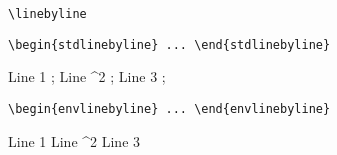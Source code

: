\documentclass{article}
\begin{document}
\verb#\linebyline#

\medskip



\bigskip


\verb#\begin{stdlinebyline} ... \end{stdlinebyline}#

\medskip

\begin{stdlinebyline}
    Line 1  ;
    Line ^2 ;
    Line 3  ;
\end{stdlinebyline}


\bigskip


\verb#\begin{envlinebyline} ... \end{envlinebyline}#

\medskip

\begin{envlinebyline}
    Line 1
    Line ^2
    Line 3
\end{envlinebyline}
\end{document}
